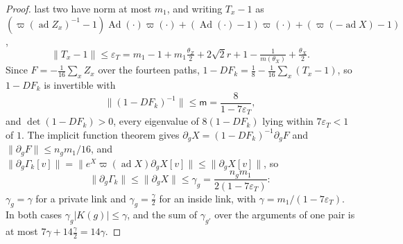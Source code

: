 \documentclass[11pt]{amsart}
\theoremstyle{definition}
\theoremstyle{remark}
\numberwithin{equation}{section}
\begin{document}
\begin{proof}
last two have norm at most $m_1$, and writing $T_x-1$ as
$(\varpi(\operatorname{ad}Z_x)^{-1}-1)\operatorname{Ad}(\cdot)
\varpi(\cdot)+(\operatorname{Ad}(\cdot)-1)\varpi(\cdot)+(\varpi(-\operatorname{ad}
X)-1)$,
\[
\lVert T_x-1\rVert\le\varepsilon_T=m_1-1+m_1\tfrac{\theta_Z}2+2\sqrt2r
+1-\tfrac1{m(\theta_X)}+\tfrac{\theta_X}2 .
\]
Since $F=-\frac1{16}\sum_xZ_x$ over the fourteen paths, $1-DF_k=\frac18
-\frac1{16}\sum_x(T_x-1)$, so $1-DF_k$ is invertible with
\[
\lVert(1-DF_k)^{-1}\rVert\le\mathsf m=\frac8{1-7\varepsilon_T},
\]
and $\det(1-DF_k)>0$, every eigenvalue of $8(1-DF_k)$ lying within
$7\varepsilon_T<1$ of $1$. The implicit function theorem gives
$\partial_gX=(1-DF_k)^{-1}\partial_gF$ and $\lVert\partial_gF\rVert\le
n_gm_1/16$, and $\lVert\partial_g\Gamma_k[v]\rVert=\lVert e^X\varpi(
\operatorname{ad}X)\partial_gX[v]\rVert\le\lVert\partial_gX[v]\rVert$, so
\[
\lVert\partial_g\Gamma_k\rVert\le\lVert\partial_gX\rVert\le\gamma_g=
\frac{n_gm_1}{2(1-7\varepsilon_T)} :
\]
$\gamma_g=\gamma$ for a private link and $\gamma_g=\frac\gamma2$ for an
inside link, with $\gamma=m_1/(1-7\varepsilon_T)$. In both cases
$\gamma_g\lvert K(g)\rvert\le\gamma$, and the sum of $\gamma_{g'}$ over
the arguments of one pair is at most $7\gamma+14\frac\gamma2=14\gamma$.


\end{proof}
\end{document}
